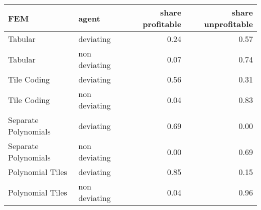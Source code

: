 \begin{tabular}{llrr}
  \hline
FEM & agent & share profitable & share unprofitable \\ 
  \hline
Tabular & deviating & 0.24 & 0.57 \\ 
  Tabular & non deviating & 0.07 & 0.74 \\ 
  Tile Coding & deviating & 0.56 & 0.31 \\ 
  Tile Coding & non deviating & 0.04 & 0.83 \\ 
  Separate Polynomials & deviating & 0.69 & 0.00 \\ 
  Separate Polynomials & non deviating & 0.00 & 0.69 \\ 
  Polynomial Tiles & deviating & 0.85 & 0.15 \\ 
  Polynomial Tiles & non deviating & 0.04 & 0.96 \\ 
   \hline
\end{tabular}
